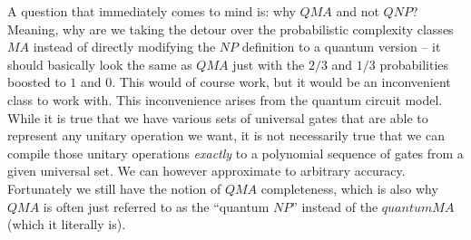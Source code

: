 A question that immediately comes to mind is: why $QMA$ and not $QNP$? Meaning, why are we taking the detour over the probabilistic complexity classes $MA$ instead of directly modifying the $NP$ definition to a quantum version -- it should basically look the same as $QMA$ just with the $2/3$ and $1/3$ probabilities boosted to $1$ and $0$. This would of course work, but it would be an inconvenient class to work with. This inconvenience arises from the quantum circuit model. While it is true that we have various sets of universal gates that are able to represent any unitary operation we want, it is not necessarily true that we can compile those unitary operations \textit{exactly} to a polynomial sequence of gates from a given universal set. We can however approximate to arbitrary accuracy.\\
Fortunately we still have the notion of $QMA$ completeness, which is also why $QMA$ is often just referred to as the ``quantum $NP$'' instead of the $quantum MA$ (which it literally is).



